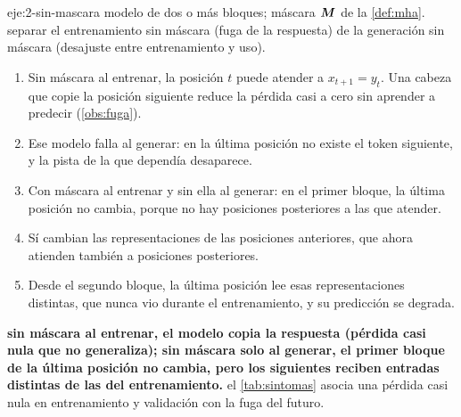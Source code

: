 \begin{solucion}{eje:2-sin-mascara}
\datos modelo de dos o más bloques; máscara $\bm{M}$ de la \cref{def:mha}.
\planteamiento separar el entrenamiento sin máscara (fuga de la respuesta) de la generación sin máscara (desajuste entre entrenamiento y uso).
\pasos
\begin{enumerate}[label=\arabic*.]
  \item Sin máscara al entrenar, la posición $t$ puede atender a $x_{t+1}=y_t$. Una cabeza que copie la posición siguiente reduce la pérdida casi a cero sin aprender a predecir (\cref{obs:fuga}).
  \item Ese modelo falla al generar: en la última posición no existe el token siguiente, y la pista de la que dependía desaparece.
  \item Con máscara al entrenar y sin ella al generar: en el primer bloque, la última posición no cambia, porque no hay posiciones posteriores a las que atender.
  \item Sí cambian las representaciones de las posiciones anteriores, que ahora atienden también a posiciones posteriores.
  \item Desde el segundo bloque, la última posición lee esas representaciones distintas, que nunca vio durante el entrenamiento, y su predicción se degrada.
\end{enumerate}
\resultado \textbf{sin máscara al entrenar, el modelo copia la respuesta (pérdida casi nula que no generaliza); sin máscara solo al generar, el primer bloque de la última posición no cambia, pero los siguientes reciben entradas distintas de las del entrenamiento.}
\comprobacion el \cref{tab:sintomas} asocia una pérdida casi nula en entrenamiento y validación con la fuga del futuro.
\end{solucion}

